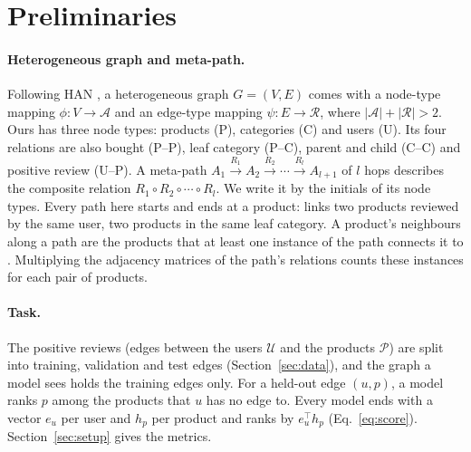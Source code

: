 \section{Preliminaries}
\label{sec:prelim}

\paragraph{Heterogeneous graph and meta-path.} Following HAN \citep{wang2019heterogeneous}, a
heterogeneous graph $G = (V, E)$ comes with a node-type mapping $\phi \colon V \to \mathcal{A}$ and
an edge-type mapping $\psi \colon E \to \mathcal{R}$, where $|\mathcal{A}| + |\mathcal{R}| > 2$.
Ours has three node types: products (P), categories (C) and users (U). Its four relations are also
bought (P--P), leaf category (P--C), parent and child (C--C) and positive review (U--P). A meta-path
$A_1 \xrightarrow{R_1} A_2 \xrightarrow{R_2} \cdots \xrightarrow{R_l} A_{l+1}$ of $l$ hops
describes the composite relation $R_1 \circ R_2 \circ \cdots \circ R_l$. We write it by the initials
of its node types. Every path here starts and ends at a product:  links two products
reviewed by the same user,  two products in the same leaf category. A product's
neighbours along a path are the products that at least one instance of the path connects it to
\citep{wang2019heterogeneous}. Multiplying the adjacency matrices of the path's relations counts
these instances for each pair of products.

\paragraph{Task.} The positive reviews (edges between the users $\mathcal{U}$ and the products
$\mathcal{P}$) are split into training, validation and test edges (Section~\ref{sec:data}), and the
graph a model sees holds the training edges only. For a held-out edge $(u, p)$, a model ranks $p$
among the products that $u$ has no edge to. Every model ends with a vector $e_u$ per user and $h_p$
per product and ranks by $e_u^{\top} h_p$ (Eq.~\ref{eq:score}). Section~\ref{sec:setup} gives the
metrics.
